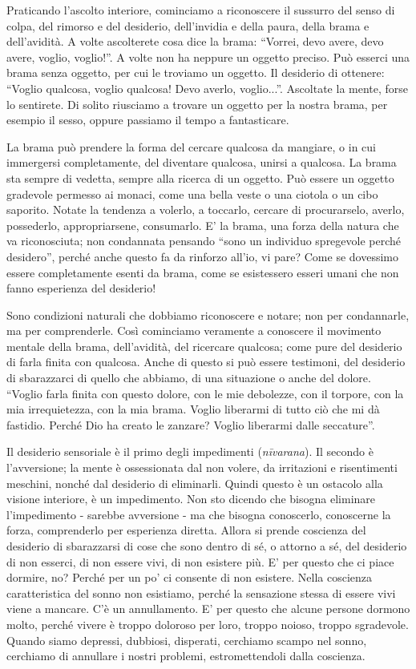 
Praticando l'ascolto interiore, cominciamo a riconoscere il sussurro del
senso di colpa, del rimorso e del desiderio, dell'invidia e della paura,
della brama e dell'avidità. A volte ascolterete cosa dice la brama:
``Vorrei, devo avere, devo avere, voglio, voglio!''. A volte non ha
neppure un oggetto preciso. Può esserci una brama senza oggetto, per cui
le troviamo un oggetto. Il desiderio di ottenere: ``Voglio qualcosa,
voglio qualcosa! Devo averlo, voglio...''. Ascoltate la mente, forse lo
sentirete. Di solito riusciamo a trovare un oggetto per la nostra brama,
per esempio il sesso, oppure passiamo il tempo a fantasticare.

La brama può prendere la forma del cercare qualcosa da mangiare, o in
cui immergersi completamente, del diventare qualcosa, unirsi a qualcosa.
La brama sta sempre di vedetta, sempre alla ricerca di un oggetto. Può
essere un oggetto gradevole permesso ai monaci, come una bella veste o
una ciotola o un cibo saporito. Notate la tendenza a volerlo, a
toccarlo, cercare di procurarselo, averlo, possederlo, appropriarsene,
consumarlo. E' la brama, una forza della natura che va riconosciuta; non
condannata pensando ``sono un individuo spregevole perché desidero'',
perché anche questo fa da rinforzo all'io, vi pare? Come se dovessimo
essere completamente esenti da brama, come se esistessero esseri umani
che non fanno esperienza del desiderio!

Sono condizioni naturali che dobbiamo riconoscere e notare; non per
condannarle, ma per comprenderle. Così cominciamo veramente a conoscere
il movimento mentale della brama, dell'avidità, del ricercare qualcosa;
come pure del desiderio di farla finita con qualcosa. Anche di questo si
può essere testimoni, del desiderio di sbarazzarci di quello che
abbiamo, di una situazione o anche del dolore. ``Voglio farla finita con
questo dolore, con le mie debolezze, con il torpore, con la mia
irrequietezza, con la mia brama. Voglio liberarmi di tutto ciò che mi dà
fastidio. Perché Dio ha creato le zanzare? Voglio liberarmi dalle
seccature''.

Il desiderio sensoriale è il primo degli impedimenti (\textit{nīvarana}). Il
secondo è l'avversione; la mente è ossessionata dal non volere, da
irritazioni e risentimenti meschini, nonché dal desiderio di eliminarli.
Quindi questo è un ostacolo alla visione interiore, è un impedimento.
Non sto dicendo che bisogna eliminare l'impedimento - sarebbe avversione
- ma che bisogna conoscerlo, conoscerne la forza, comprenderlo per
esperienza diretta. Allora si prende coscienza del desiderio di
sbarazzarsi di cose che sono dentro di sé, o attorno a sé, del desiderio
di non esserci, di non essere vivi, di non esistere più. E' per questo
che ci piace dormire, no? Perché per un po' ci consente di non esistere.
Nella coscienza caratteristica del sonno non esistiamo, perché la
sensazione stessa di essere vivi viene a mancare. C'è un annullamento.
E' per questo che alcune persone dormono molto, perché vivere è troppo
doloroso per loro, troppo noioso, troppo sgradevole. Quando siamo
depressi, dubbiosi, disperati, cerchiamo scampo nel sonno, cerchiamo di
annullare i nostri problemi, estromettendoli dalla coscienza.

